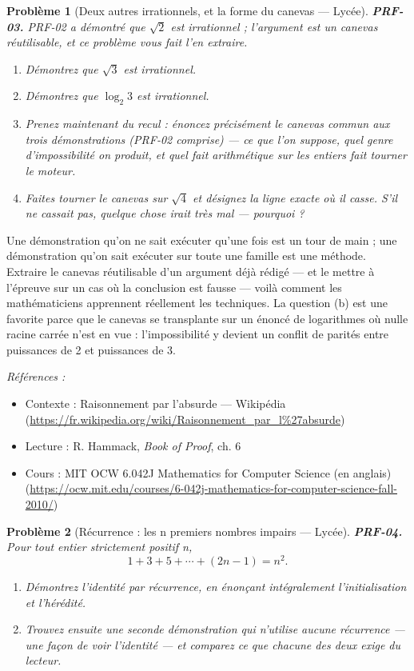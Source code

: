 \documentclass[11pt]{article}
\newtheorem{problem}{Problème}
\newenvironment{refs}{\par\small\noindent\emph{Références :}\begin{itemize}\setlength\itemsep{0pt}}{\end{itemize}\normalsize}
\begin{document}
\bigskip

\begin{problem}[{Deux autres irrationnels, et la forme du canevas --- Lycée}]
\textbf{PRF-03.} PRF-02 a démontré que $ \sqrt{2} $ est irrationnel ; l'argument
est un canevas réutilisable, et ce problème vous fait l'en extraire.
\begin{enumerate}
\item[(a)] Démontrez que $ \sqrt{3} $ est irrationnel.
\item[(b)] Démontrez que $ \log_2 3 $ est irrationnel.
\item[(c)] Prenez maintenant du recul : énoncez précisément le canevas commun aux trois
démonstrations (PRF-02 comprise) --- ce que l'on suppose, quel genre d'impossibilité on
produit, et quel fait arithmétique sur les entiers fait tourner le moteur.
\item[(d)] Faites tourner le canevas sur $ \sqrt{4} $ et désignez la ligne exacte où il casse.
S'il ne cassait pas, quelque chose irait très mal --- pourquoi ?
\end{enumerate}

\end{problem}

\noindent Une démonstration qu'on ne sait exécuter qu'une fois est un tour de main ;
une démonstration qu'on sait exécuter sur toute une famille est une méthode. Extraire le
canevas réutilisable d'un argument déjà rédigé --- et le mettre à l'épreuve sur un cas où la
conclusion est fausse --- voilà comment les mathématiciens apprennent réellement les
techniques. La question (b) est une favorite parce que le canevas se transplante sur un
énoncé de logarithmes où nulle racine carrée n'est en vue : l'impossibilité y devient un
conflit de parités entre puissances de 2 et puissances de 3.

\begin{refs}
\item Contexte : Raisonnement par l'absurde --- Wikipédia (\url{https://fr.wikipedia.org/wiki/Raisonnement_par_l%27absurde})
\item Lecture : R. Hammack, \textit{Book of Proof}, ch. 6
\item Cours : MIT OCW 6.042J Mathematics for Computer Science (en anglais) (\url{https://ocw.mit.edu/courses/6-042j-mathematics-for-computer-science-fall-2010/})
\end{refs}

\bigskip

\begin{problem}[{Récurrence : les n premiers nombres impairs --- Lycée}]
\textbf{PRF-04.} Pour tout entier strictement positif n,
\[ 1 + 3 + 5 + \cdots + (2n-1) = n^2 . \]
\begin{enumerate}
\item[(a)] Démontrez l'identité par récurrence, en énonçant intégralement l'initialisation et
l'hérédité.
\item[(b)] Trouvez ensuite une seconde démonstration qui n'utilise aucune récurrence --- une façon
de \textit{voir} l'identité --- et comparez ce que chacune des deux exige du lecteur.
\end{enumerate}

\end{problem}
\end{document}
